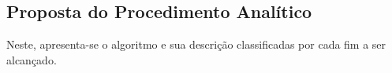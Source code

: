    \subsection{Proposta do Procedimento Analítico} \label{sec:proposta}

      Neste, apresenta-se o algoritmo e sua descrição classificadas por cada fim a ser alcançado.

